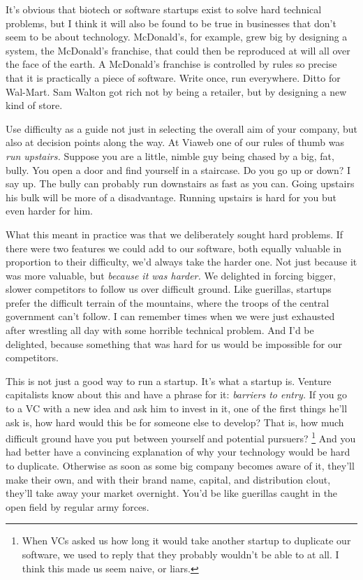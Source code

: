 It's obvious that biotech or software startups exist to solve hard
technical problems, but I think it will also be found to be true in
businesses that don't seem to be about technology. McDonald's, for
example, grew big by designing a system, the McDonald's franchise, that
could then be reproduced at will all over the face of the earth. A
McDonald's franchise is controlled by rules so precise that it is
practically a piece of software. Write once, run everywhere. Ditto for
Wal-Mart. Sam Walton got rich not by being a retailer, but by designing
a new kind of store.

Use difficulty as a guide not just in selecting the overall aim of your
company, but also at decision points along the way. At Viaweb one of our
rules of thumb was \emph{run upstairs.} Suppose you are a little, nimble
guy being chased by a big, fat, bully. You open a door and find yourself
in a staircase. Do you go up or down? I say up. The bully can probably
run downstairs as fast as you can. Going upstairs his bulk will be more
of a disadvantage. Running upstairs is hard for you but even harder for
him.

What this meant in practice was that we deliberately sought hard
problems. If there were two features we could add to our software, both
equally valuable in proportion to their difficulty, we'd always take the
harder one. Not just because it was more valuable, but \emph{because it
was harder.} We delighted in forcing bigger, slower competitors to
follow us over difficult ground. Like guerillas, startups prefer the
difficult terrain of the mountains, where the troops of the central
government can't follow. I can remember times when we were just
exhausted after wrestling all day with some horrible technical problem.
And I'd be delighted, because something that was hard for us would be
impossible for our competitors.

This is not just a good way to run a startup. It's what a startup is.
Venture capitalists know about this and have a phrase for it:
\emph{barriers to entry.} If you go to a VC with a new idea and ask him
to invest in it, one of the first things he'll ask is, how hard would
this be for someone else to develop? That is, how much difficult ground
have you put between yourself and potential pursuers?
\footnote{When VCs asked us how long it would take another startup to
duplicate our software, we used to reply that they probably wouldn't be
able to at all. I think this made us seem naive, or liars.} And you had better have a convincing explanation
of why your technology would be hard to duplicate. Otherwise as soon as
some big company becomes aware of it, they'll make their own, and with
their brand name, capital, and distribution clout, they'll take away
your market overnight. You'd be like guerillas caught in the open field
by regular army forces.

